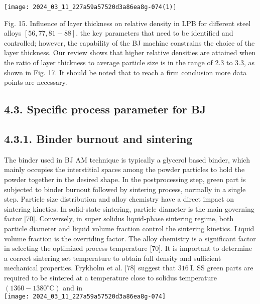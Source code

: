 \documentclass[10pt]{article}
\begin{document}
\begin{center}
\texttt{[image: 2024\_03\_11\_227a59a57520d3a86ea8g-074(1)]}
\end{center}

Fig. 15. Influence of layer thickness on relative density in LPB for different steel alloys $[56,77,81-88]$. the key parameters that need to be identified and controlled; however, the capability of the BJ machine constrains the choice of the layer thickness. Our review shows that higher relative densities are attained when the ratio of layer thickness to average particle size is in the range of 2.3 to 3.3, as shown in Fig. 17. It should be noted that to reach a firm conclusion more data points are necessary.

\subsection*{4.3. Specific process parameter for BJ}
\subsection*{4.3.1. Binder burnout and sintering}
The binder used in BJ AM technique is typically a glycerol based binder, which mainly occupies the interstitial spaces among the powder particles to hold the powder together in the desired shape. In the postprocessing step, green part is subjected to binder burnout followed by sintering process, normally in a single step. Particle size distribution and alloy chemistry have a direct impact on sintering kinetics. In solid-state sintering, particle diameter is the main governing factor [70]. Conversely, in super solidus liquid-phase sintering regime, both particle diameter and liquid volume fraction control the sintering kinetics. Liquid volume fraction is the overriding factor. The alloy chemistry is a significant factor in selecting the optimized process temperature [70]. It is important to determine a correct sintering set temperature to obtain full density and sufficient mechanical properties. Frykholm et al. [78] suggest that $316 \mathrm{~L}$ SS green parts are required to be sintered at a temperature close to solidus temperature $\left(1360-1380{ }^{\circ} \mathrm{C}\right)$ and in\\
\texttt{[image: 2024\_03\_11\_227a59a57520d3a86ea8g-074]}
\end{document}
